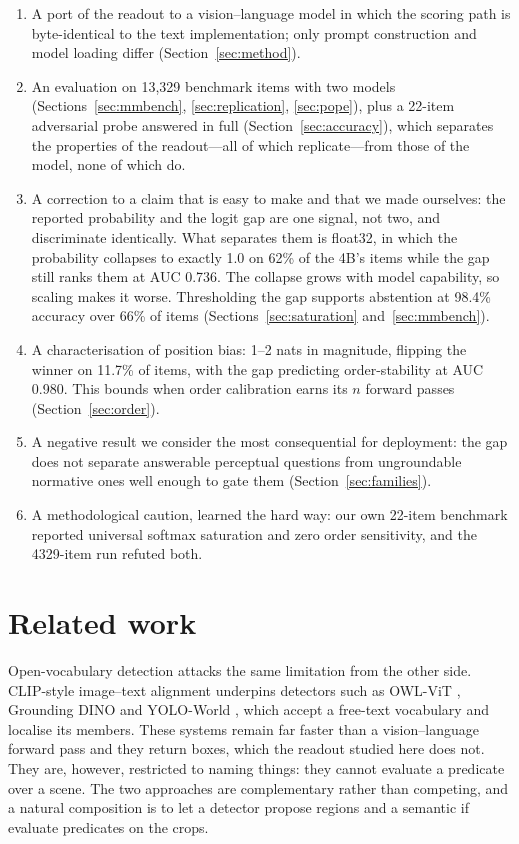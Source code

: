 \documentclass[10pt,twocolumn]{article}
\begin{document}
\begin{enumerate}\itemsep2pt
\item A port of the readout to a vision--language model in which the scoring
      path is byte-identical to the text implementation; only prompt
      construction and model loading differ (Section~\ref{sec:method}).
\item An evaluation on 13,329 benchmark items with two models
      (Sections~\ref{sec:mmbench}, \ref{sec:replication}, \ref{sec:pope}),
      plus a 22-item adversarial probe answered in full
      (Section~\ref{sec:accuracy}), which separates the properties of the
      readout---all of which replicate---from those of the model, none of which
      do.
\item A correction to a claim that is easy to make and that we made
      ourselves: the reported probability and the logit gap are one signal, not
      two, and discriminate identically. What separates them is float32, in
      which the probability collapses to exactly 1.0 on 62\% of the 4B's items
      while the gap still ranks them at AUC 0.736. The collapse grows with
      model capability, so scaling makes it worse. Thresholding the gap
      supports abstention at 98.4\% accuracy over 66\% of items
      (Sections~\ref{sec:saturation} and~\ref{sec:mmbench}).
\item A characterisation of position bias: 1--2 nats in magnitude, flipping the
      winner on 11.7\% of items, with the gap predicting order-stability at
      AUC 0.980. This bounds when order calibration earns its $n$ forward
      passes (Section~\ref{sec:order}).
\item A negative result we consider the most consequential for deployment: the
      gap does not separate answerable perceptual questions from ungroundable
      normative ones well enough to gate them (Section~\ref{sec:families}).
\item A methodological caution, learned the hard way: our own 22-item benchmark
      reported universal softmax saturation and zero order sensitivity, and the
      4329-item run refuted both.
\end{enumerate}

\section{Related work}

Open-vocabulary detection attacks the same limitation from the other side.
CLIP-style image--text alignment \cite{radford2021clip} underpins detectors
such as OWL-ViT \cite{minderer2022owlvit}, Grounding DINO
\cite{liu2023groundingdino} and YOLO-World \cite{cheng2024yoloworld}, which
accept a free-text vocabulary and localise its members. These systems remain
far faster than a vision--language forward pass and they return boxes, which
the readout studied here does not. They are, however, restricted to naming
things: they cannot evaluate a predicate over a scene. The two approaches are
complementary rather than competing, and a natural composition is to let a
detector propose regions and a semantic if evaluate predicates on the crops.
\end{document}

